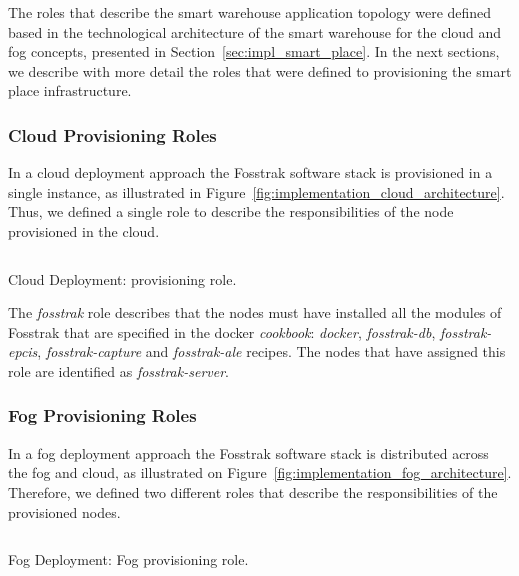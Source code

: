 The roles that describe the smart warehouse application topology were defined based in the
technological architecture of the smart warehouse for the cloud and fog concepts, presented in Section~\ref{sec:impl_smart_place}.
In the next sections, we describe with more detail the roles that were defined to provisioning the
smart place infrastructure.

\subsubsection{Cloud Provisioning Roles}
\label{sub:cloud_roles}
In a cloud deployment approach the Fosstrak software stack is provisioned in a single instance, as
illustrated in Figure~\ref{fig:implementation_cloud_architecture}. Thus, we defined a single role
to describe the responsibilities of the node provisioned in the cloud.\\

\begin{listing}[ht!]
  \inputminted[frame=lines,
                 framesep=3mm,
                 linenos=true,
                 xleftmargin=21pt,
                 tabsize=4]{json}{./listings/fosstrak_role.json}
  \caption{Cloud Deployment: provisioning role.}
  \label{listing:cloud_recipe}
\end{listing}

The \textit{fosstrak} role describes that the nodes must have installed all the modules of Fosstrak
that are specified in the docker \textit{cookbook}: \textit{docker}, \textit{fosstrak-db},
\textit{fosstrak-epcis}, \textit{fosstrak-capture} and \textit{fosstrak-ale} recipes. The nodes
that have assigned this role are identified as \textit{fosstrak-server}.


\subsubsection{Fog Provisioning Roles}
\label{subs:fog_roles}
In a fog deployment approach the Fosstrak software stack is distributed across the fog and cloud,
as illustrated on Figure~\ref{fig:implementation_fog_architecture}. Therefore, we defined two different
roles that describe the responsibilities of the provisioned nodes.

\begin{listing}[ht!]
  \inputminted[frame=lines,
                 framesep=3mm,
                 linenos=true,
                 xleftmargin=21pt,
                 tabsize=4]{json}{./listings/fog_role.json}
  \caption{Fog Deployment: Fog provisioning role.}
  \label{listing:fog_fog_recipe}
\end{listing}

